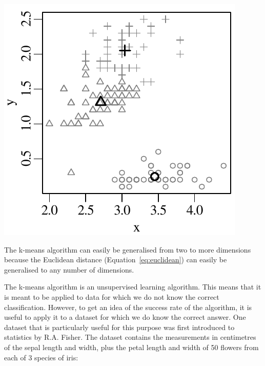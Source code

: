\begin{enumerate}
  \noindent\begin{minipage}[t][][b]{.25\linewidth}
  \includegraphics[width=\textwidth]{../figures/kmeans5.pdf}\medskip
  \end{minipage}
  \begin{minipage}[t][][t]{.75\linewidth}
    \label{fig:kmeans5}
  \end{minipage}

\end{enumerate}

The k-means algorithm can easily be generalised from two to more
dimensions because the Euclidean distance
(Equation~\ref{eq:euclidean}) can easily be generalised to any number
of dimensions.\medskip

The k-means algorithm is an unsupervised learning algorithm. This
means that it is meant to be applied to data for which we do not know
the correct classification. However, to get an idea of the success
rate of the algorithm, it is useful to apply it to a dataset for which
we do know the correct answer.  One dataset that is particularly
useful for this purpose was first introduced to statistics by
R.A. Fisher. The dataset contains the measurements in centimetres of
the sepal length and width, plus the petal length and width of 50
flowers from each of 3 species of iris:

